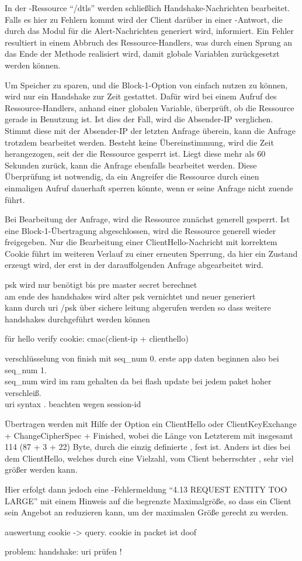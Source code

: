 In der -Ressource "`/dtls"' werden schließlich Handshake-Nachrichten bearbeitet. Falls es hier zu Fehlern kommt wird der Client darüber in einer
-Antwort, die durch das Modul für die Alert-Nachrichten generiert wird, informiert. Ein Fehler resultiert in einem Abbruch des Ressource-Handlers,
was durch einen Sprung an das Ende der Methode realisiert wird, damit globale Variablen zurückgesetzt werden können.

Um Speicher zu sparen, und die Block-1-Option von  einfach nutzen zu können, wird nur ein Handshake zur Zeit gestattet. Dafür wird bei einem Aufruf des
Ressource-Handlers, anhand einer globalen Variable, überprüft, ob die Ressource gerade in Benutzung ist. Ist dies der Fall, wird die Absender-IP verglichen.
Stimmt diese mit der Absender-IP der letzten Anfrage überein, kann die Anfrage trotzdem bearbeitet werden. Besteht keine Übereinstimmung, wird die Zeit herangezogen,
seit der die Ressource gesperrt ist. Liegt diese mehr als 60 Sekunden zurück, kann die Anfrage ebenfalls bearbeitet werden. Diese Überprüfung ist notwendig, da
ein Angreifer die Ressource durch einen einmaligen Aufruf dauerhaft sperren könnte, wenn er seine Anfrage nicht zuende führt.

Bei Bearbeitung der Anfrage, wird die Ressource zunächst generell gesperrt. Ist eine Block-1-Übertragung abgeschlossen, wird die Ressource generell wieder freigegeben.
Nur die Bearbeitung einer ClientHello-Nachricht mit korrektem Cookie führt im weiteren Verlauf zu einer erneuten Sperrung, da hier ein Zustand erzeugt wird, der erst
in der darauffolgenden Anfrage abgearbeitet wird.

psk wird nur benötigt bis pre master secret berechnet\\
am ende des handshakes wird alter psk vernichtet und neuer generiert\\
kann durch uri /psk über sichere leitung abgerufen werden so dass weitere handshakes durchgeführt werden können

für hello verify cookie: cmac(client-ip + clienthello)

verschlüsselung von finish mit seq\_num 0. erste app daten beginnen also bei seq\_num 1.\\
seq\_num wird im ram gehalten da bei flash update bei jedem paket hoher verschleiß.\\

uri syntax \cite{rfc3986}. beachten wegen session-id

Übertragen werden mit Hilfe der Option ein ClientHello oder ClientKeyExchange + ChangeCipherSpec + Finished, wobei die Länge von Letzterem mit
insgesamt 114 (87 + 3 + 22) Byte, durch die einzig definierte , fest ist. Anders ist dies bei dem ClientHello, welches durch
eine Vielzahl, vom Client beherrschter , sehr viel größer werden kann.

Hier erfolgt dann jedoch eine -Fehlermeldung "`4.13 REQUEST ENTITY TOO LARGE"' mit einem Hinweis auf die begrenzte Maximalgröße,
so dass ein Client sein Angebot an  reduzieren kann, um der maximalen Größe gerecht zu werden.

auswertung cookie -> query. cookie in packet ist doof

problem: handshake: uri prüfen !